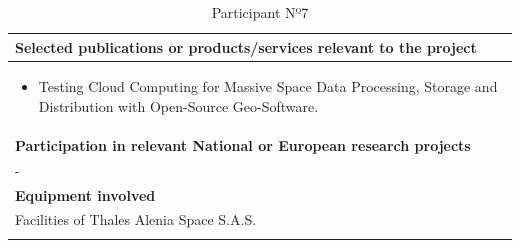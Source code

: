 \begin{longtable}[H]{|p{0.7cm}|p{4cm}|p{7cm}|p{1.3cm}|}
	\multicolumn{4}{|p{13cm}|}{\textbf{Selected publications or products/services relevant to the project}}  \\ \hline
	
	\multicolumn{4}{|p{14.5cm}|}{
	\begin{itemize}
		\item Testing Cloud Computing for Massive Space Data Processing, Storage and Distribution with Open-Source Geo-Software.
	\end{itemize}}  \\ \hline
	
	\multicolumn{4}{|p{13cm}|}{\textbf{Participation in relevant National or European research projects}}  \\ \hline
	
	\multicolumn{4}{|p{14.5cm}|}{-}  \\ \hline
	
	\multicolumn{4}{|p{13cm}|}{\textbf{Equipment involved}}  \\ \hline
	
	\multicolumn{4}{|p{14.5cm}|}{Facilities of Thales Alenia Space S.A.S.}  \\ \hline
	\caption{Participant Nº7}
\end{longtable}

